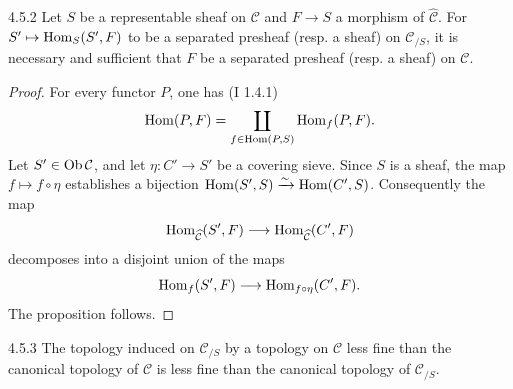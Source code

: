 \begin{proposition}{4.5.2}\label{IV.4.5.2}
Let \(S\) be a representable sheaf on \(\mathcal C\) and
\(F\to S\) a morphism of \(\widehat{\mathcal C}\).
For \(S'\mapsto\operatorname{Hom}_S(S',F)\) to be a separated presheaf
(resp. a sheaf) on \(\mathcal C_{/S}\), it is necessary and
sufficient that \(F\) be a separated presheaf (resp. a sheaf)
on \(\mathcal C\).
\end{proposition}
\begin{proof}
For every functor \(P\), one has (I 1.4.1)
\[
\operatorname{Hom}(P,F)=\coprod_{f\in\operatorname{Hom}(P,S)}\operatorname{Hom}_f(P,F).
\]
Let \(S'\in\operatorname{Ob}\mathcal C\), and let \(\eta:C'\to S'\) be
a covering sieve. Since \(S\) is a sheaf, the map
\(f\mapsto f\circ\eta\) establishes a bijection
\(\operatorname{Hom}(S',S)\xrightarrow{\sim}\operatorname{Hom}(C',S)\).
Consequently the map
\[
\operatorname{Hom}_{\widehat{\mathcal C}}(S',F)
\longrightarrow\operatorname{Hom}_{\widehat{\mathcal C}}(C',F)
\]
decomposes into a \og disjoint union\fg{} of the maps
\[
\operatorname{Hom}_f(S',F)\longrightarrow\operatorname{Hom}_{f\circ\eta}(C',F).
\]
The proposition follows.
\end{proof}

\begin{corollary}{4.5.3}\label{IV.4.5.3}
The topology induced on \(\mathcal C_{/S}\) by a topology
on \(\mathcal C\) less fine than the canonical topology of
\(\mathcal C\) is less fine than the canonical topology of
\(\mathcal C_{/S}\).
\end{corollary}

